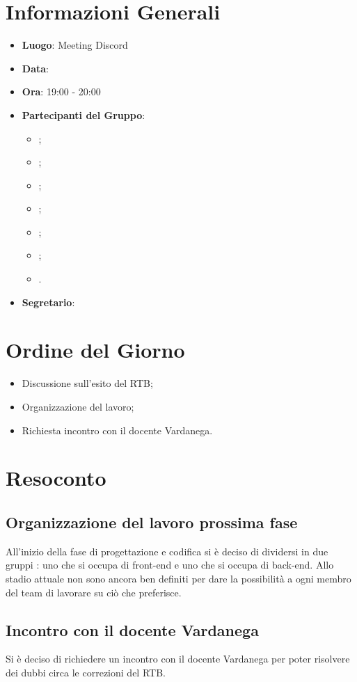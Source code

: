 \section{Informazioni Generali}

\begin{itemize}
\item{\textbf{Luogo}}: Meeting Discord
\item{\textbf{Data}}: \D
\item{\textbf{Ora}}: 19:00 - 20:00
\item{\textbf{Partecipanti del Gruppo}}: 
	\begin{itemize}
	\item{\EP{};} 
	\item{\FP{};}
	\item{\GC{};}
	\item{\LW{};}
	\item{\MB{};}
	\item{\MG{};}
	\item{\PV{}.}
	\end{itemize} 
\item{\textbf{Segretario}}: \PV{}	
\end{itemize}

\section{Ordine del Giorno}
\begin{itemize}
\item{Discussione sull'esito del RTB;}
\item{Organizzazione del lavoro;}
\item{Richiesta incontro con il docente Vardanega.}
\end{itemize}

\section{Resoconto}
 
\subsection{Organizzazione del lavoro prossima fase} 
All'inizio della fase di progettazione e codifica si è deciso di dividersi in due gruppi : uno che si occupa di front-end e uno che si occupa di back-end. Allo stadio attuale non sono ancora ben definiti per dare la possibilità a ogni membro del team di lavorare su ciò che preferisce.
 
\subsection{Incontro con il docente Vardanega}
Si è deciso di richiedere un incontro con il docente Vardanega per poter risolvere dei dubbi circa le correzioni del RTB.
